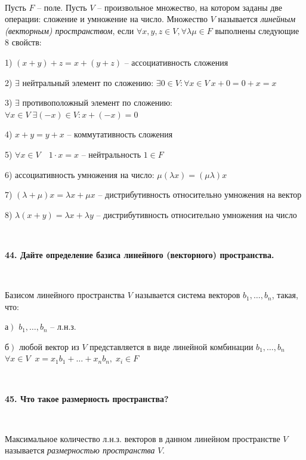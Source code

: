 \documentclass{article}
\begin{document}
	{
		$\;$
		\setlength{\parindent}{0.4cm}
		\hangindent=0.4cm
		
		Пусть $F$ -- поле. Пусть $V$ -- произвольное множество, на котором заданы две операции: сложение и умножение на число. Множество $V$ называется \textit{линейным (векторным) пространством}, если $\forall x, y, z\in V, \forall\lambda\mu\in F$ выполнены следующие 8 свойств:
		
		1) $(x+y)+z=x+(y+z)$ -- ассоциативность сложения
		
		2) $\exists$ нейтральный элемент по сложению: $\exists 0\in V:\forall x\in V\ x+0=0+x=x$
		
		3) $\exists$ противоположный элемент по сложению: $\forall x\in V\;\exists(-x)\in V:x+(-x)=0$
		
		4) $x+y=y+x$ -- коммутативность сложения
		
		5) $\forall x\in V\quad1\cdot x=x$ -- нейтральность $1\in F$
		
		6) ассоциативность умножения на число: $\mu(\lambda x)=(\mu\lambda)x$
		
		7) $(\lambda+\mu)x=\lambda x+\mu x$ -- дистрибутивность относительно умножения на вектор
		
		8) $\lambda(x+y)=\lambda x+\lambda y$ -- дистрибутивность относительно умножения на число
		
		$\;$
		\setlength{\parindent}{0cm}
		\hangindent=0cm
	}
	
	\textbf{44. Дайте определение базиса линейного (векторного) пространства.}
	
	{
		$\;$
		\setlength{\parindent}{0.4cm}
		\hangindent=0.4cm
		
		Базисом линейного пространства $V$ называется система векторов $b_1, \ldots, b_n$, такая, что:
		
		а$\left. \right) $ $b_1, \ldots, b_n$ -- л.н.з.
		
		б$\left. \right) $ любой вектор из $V$ представляется в виде линейной комбинации $b_1, \ldots, b_n$ $\forall x\in V\;\; x=x_1b_1+\ldots+x_nb_n,\; x_i\in F$
		
		$\;$
		\setlength{\parindent}{0cm}
		\hangindent=0cm
	}
	
	\textbf{45. Что такое размерность пространства?}
	
	{
		$\;$
		\setlength{\parindent}{0.4cm}
		\hangindent=0.4cm
		
		Максимальное количество л.н.з. векторов в данном линейном пространстве $V$ называется \textit{размерностью пространства} $V$.
		
		$\;$
		\setlength{\parindent}{0cm}
		\hangindent=0cm
	}
	
\end{document}
